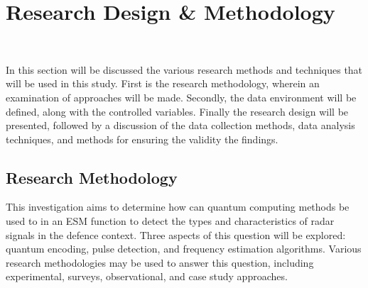 


\section{Research Design \& Methodology}~\label{sec:design}

In this section will be discussed the various research methods and techniques that will be used in this study.
First is the research methodology, wherein an examination of approaches will be made.
Secondly, the data environment will be defined, along with the controlled variables.
Finally the research design will be presented, followed by a discussion of the data collection methods, data analysis techniques, and methods for ensuring the validity the findings.

\subsection{Research Methodology}


This investigation aims to determine how can quantum computing methods be used to in an \ac{ESM} function to detect the types and characteristics of radar signals in the defence context.
Three aspects of this question will be explored: quantum encoding, pulse detection, and frequency estimation algorithms.
Various research methodologies may be used to answer this question, including experimental, surveys, observational, and case study approaches.

